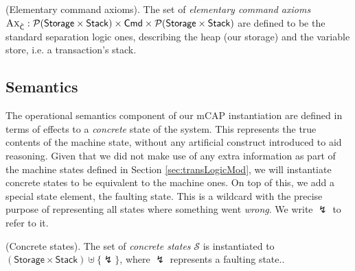 \begin{defn}
	(Elementary command axioms).
	The set of \emph{elementary command axioms} $\textsc{Ax}_{\hat{\mathsf{C}}} : \mathcal{P}(\mathsf{Storage} \times \mathsf{Stack}) \times \mathsf{Cmd} \times \mathcal{P}(\mathsf{Storage} \times \mathsf{Stack})$ are defined to be the standard separation logic ones, describing the heap (our storage) and the variable store, i.e. a transaction's stack.

	\iffalse	
	For every rule's triple $\Delta \vdash \triple{P}{\hat{\mathds{C}}}{Q}$, logical environment $e \in \mathsf{LEnv}$ and predicate environment $\delta \in \mathsf{PEnv}$, we define the corresponding axiom as $\lfloor \tsem{P}_{e, \delta} \rfloor_W \times \hat{\mathds{C}} \times \lfloor \tsem{Q}_{e, \delta} \rfloor_W$.
	\begin{gather*}
		\infer[\textsc{Write}]
		{
			\vdash
			\triple
				{\mathds{E}_1 \mapsto -}
				{\pmutate{\mathds{E}_1}{\mathds{E}_2}}
				{\mathds{E}_1 \mapsto \mathds{E}_2}
		}
		{}
		\\
		\infer[\textsc{Read}]
		{
			\vdash
			\triple
				{\pvar{x} \doteq \mathds{E}_1 \sep \cell{\mathds{E}}{\mathds{E}_2}}
				{\pderef{\pvar{x}}{\mathds{E}}}
				{\pvar{x} \doteq \mathds{E}_2[\mathds{E}_1/\pvar{x}] \sep \cell{\mathds{E}[\mathds{E}_1/\pvar{x}]}{\mathds{E}_2[\mathds{E}_1/\pvar{x}]}}
		}
		{}
		\\
		\infer[\textsc{Assign}]
		{
			\vdash
			\triple
				{P}
				{\passign{\pvar{x}}{\mathds{E}}}
				{\exists x \ldotp \pvar{x} \doteq \mathds{E}[x/\pvar{x}] \sep P[x/\pvar{x}]}	
		}
		{}
		\\
		\infer[\textsc{Alloc}]
		{
			\vdash
			\triple
				{\mathtt{emp}}
				{\palloc{\pvar{x}}{\mathds{E}}}
				{\exists y \ldotp \pvar{x} \doteq y \sep \circledast_{0 \leq i < \mathds{E}} \left(\cell{y + i}{0}\right)}
		}
		{}
	\end{gather*}
	The listed axioms come directly from the ones in standard separation logic.
	\fi
\end{defn}

\subsection{Semantics}

The operational semantics component of our mCAP instantiation are defined in terms of effects to a \textit{concrete} state of the system. This represents the true contents of the machine state, without any artificial construct introduced to aid reasoning. Given that we did not make use of any extra information as part of the machine states defined in Section \ref{sec:transLogicMod}, we will instantiate concrete states to be equivalent to the machine ones. On top of this, we add a special state element, the faulting state. This is a wildcard with the precise purpose of representing all states where something went \textit{wrong}. We write $\lightning$ to refer to it.
\begin{defn}
	(Concrete states).
	The set of \emph{concrete states} $\mathcal{S}$ is instantiated to $(\mathsf{Storage} \times \mathsf{Stack}) \uplus \{\lightning\}$, where $\lightning$ represents a faulting state..
\end{defn}

